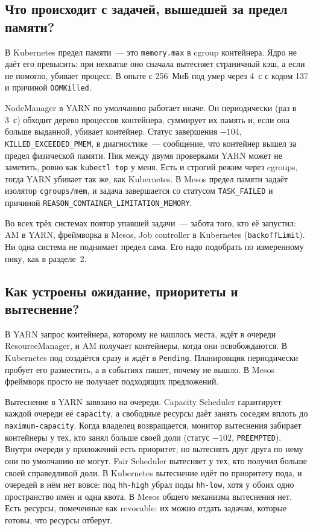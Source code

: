 \documentclass[11pt,a4paper]{article}
\begin{document}
\subsection{Что происходит с задачей, вышедшей за предел памяти?}

В Kubernetes предел памяти~--- это \texttt{memory.max} в cgroup контейнера. Ядро не даёт его превысить: при нехватке оно сначала вытесняет страничный кэш, а если не помогло, убивает процесс. В опыте с 256~МиБ под умер через 4~с с кодом 137 и причиной \texttt{OOMKilled}.

NodeManager в YARN по умолчанию работает иначе. Он периодически (раз в 3~с) обходит дерево процессов контейнера, суммирует их память и, если она больше выданной, убивает контейнер. Статус завершения $-104$, \texttt{KILLED\_EXCEEDED\_PMEM}, в диагностике~--- сообщение, что контейнер вышел за предел физической памяти. Пик между двумя проверками YARN может не заметить, ровно как \texttt{kubectl top} у меня. Есть и строгий режим через cgroups, тогда YARN убивает так же, как Kubernetes. В Mesos предел памяти задаёт изолятор \texttt{cgroups/mem}, и задача завершается со статусом \texttt{TASK\_FAILED} и причиной \texttt{REASON\_CONTAINER\_LIMITATION\_MEMORY}.

Во всех трёх системах повтор упавшей задачи~--- забота того, кто её запустил: AM в YARN, фреймворка в Mesos, Job controller в Kubernetes (\texttt{backoffLimit}). Ни одна система не поднимает предел сама. Его надо подобрать по измеренному пику, как в разделе~2.

\subsection{Как устроены ожидание, приоритеты и вытеснение?}

В YARN запрос контейнера, которому не нашлось места, ждёт в очереди ResourceManager, и AM получает контейнеры, когда они освобождаются. В Kubernetes под создаётся сразу и ждёт в \texttt{Pending}. Планировщик периодически пробует его разместить, а в событиях пишет, почему не вышло. В Mesos фреймворк просто не получает подходящих предложений.

Вытеснение в YARN завязано на очереди. Capacity Scheduler гарантирует каждой очереди её \texttt{capacity}, а свободные ресурсы даёт занять соседям вплоть до \texttt{maximum-capacity}. Когда владелец возвращается, монитор вытеснения забирает контейнеры у тех, кто занял больше своей доли (статус $-102$, \texttt{PREEMPTED}). Внутри очереди у приложений есть приоритет, но вытеснять друг друга по нему они по умолчанию не могут. Fair Scheduler вытесняет у тех, кто получил больше своей справедливой доли. В Kubernetes вытеснение идёт по приоритету пода, и очередей в нём нет вовсе: под \texttt{hh-high} убрал поды \texttt{hh-low}, хотя у обоих одно пространство имён и одна квота. В Mesos общего механизма вытеснения нет. Есть ресурсы, помеченные как revocable: их можно отдать задачам, которые готовы, что ресурсы отберут.
\end{document}
